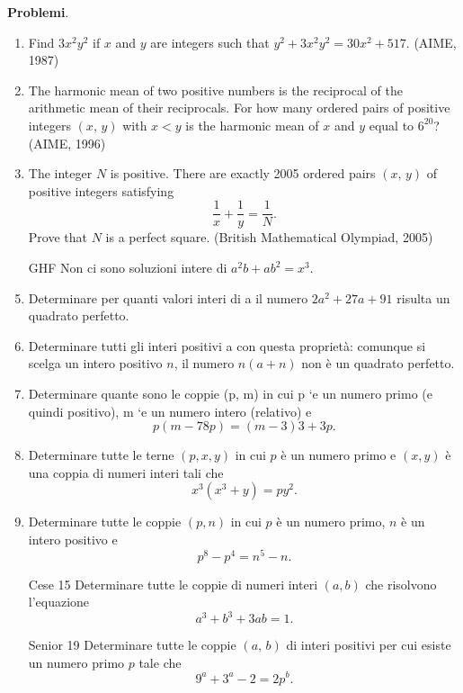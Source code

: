 \documentclass[a4paper]{article}
\theoremstyle{remark}
\theoremstyle{definition}
\begin{document}
\textbf{Problemi}.
\begin{enumerate}
	\item Find $ 3x^2y^2 $
	if $ x $ and $ y $ are integers such that $ y^2+ 3x^2y^2= 30x^2 + 517. $ (AIME, 1987)
	
	\item The harmonic mean of two positive numbers is the reciprocal of the arithmetic mean of their reciprocals.
	For how many ordered pairs of positive integers $ (x,\, y) $ with $ x < y $ is the harmonic mean of $ x $ and $ y $
	equal to $ 6^{20} $? (AIME, 1996)
	
	\item The integer $ N $ is positive. There are exactly 2005 ordered pairs $ (x,\, y) $ of positive integers satisfying
	\[ \frac{1}{x}+ \frac{1}{y} = \frac{1}{N}. \]
	Prove that $ N $ is a perfect square. (British Mathematical Olympiad, 2005)
	
	\item [GHF] Non ci sono soluzioni intere di $ a^2b + ab^2 = x^3 $.
	
	\item Determinare per quanti valori interi di a il numero $ 2a^2+27a+91 $ risulta un quadrato perfetto.
	
	\item Determinare tutti gli interi positivi a con questa propriet\`a: comunque si scelga un intero
	positivo $ n $, il numero $ n(a + n) $ non \`e un quadrato perfetto.
	
	\item Determinare quante sono le coppie (p, m) in cui p `e un numero primo (e quindi positivo), m `e
	un numero intero (relativo) e
	\[p(m - 78p) = (m - 3)3 + 3p.\]
	
	\item  Determinare tutte le terne $ (p, x, y) $ in cui $ p $ \`e un numero primo e $ (x, y) $ \`e una coppia di numeri
	interi tali che
	\[	x^3
	(x^3 + y) = py^2
	.\]
	
	\item Determinare tutte le coppie $ (p, n) $ in cui $ p $ \`e un numero primo, $ n $ \`e un intero positivo e
	\[p^8 - p^4 = n^5 - n.\]
	
	\item [Cese 15] Determinare tutte le coppie di numeri interi $ (a, b) $ che risolvono l’equazione \[a^3 + b^3 + 3ab = 1.\]
	
	\item [Senior 19] Determinare tutte le coppie $ (a,\, b) $ di interi positivi per cui esiste un numero primo $ p $ tale che
	\[9^a + 3^a - 2 = 2p^b.\]
	

\end{enumerate}
\end{document}
